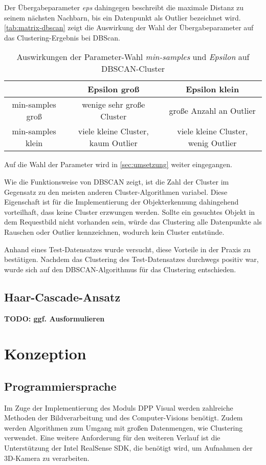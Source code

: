 \documentclass[
    type=Projektarbeit,
    status=draft, %
    language=german, %
    bibengine=bibtex,
]{unibwm-inf-thesis}
\newcommand{\todo}[1]{\textbf{TODO: #1}}
\begin{document}
    Der Übergabeparameter \textit{eps} dahingegen beschreibt die maximale Distanz zu seinem nächsten Nachbarn, bis ein Datenpunkt als Outlier bezeichnet wird.
    \autoref{tab:matrix-dbscan} zeigt die Auswirkung der Wahl der Übergabeparameter auf das Clustering-Ergebnis bei DBScan.
    \begin{table}[h]
        \centering
        \begin{tabular}{c | c | c}
            & Epsilon groß & Epsilon klein \\ \hline
            min-samples groß & wenige sehr große Cluster & große Anzahl an Outlier\\ \hline
            min-samples klein & viele kleine Cluster, kaum Outlier & viele kleine Cluster, wenig Outlier
        \end{tabular}
        \caption{Auswirkungen der Parameter-Wahl \textit{min-samples} und \textit{Epsilon} auf DBSCAN-Cluster}
        \label{tab:matrix-dbscan}
    \end{table}

    Auf die Wahl der Parameter wird in \autoref{sec:umsetzung} weiter eingegangen.

    Wie die Funktionsweise von DBSCAN zeigt, ist die Zahl der Cluster im Gegensatz zu den meisten anderen Cluster-Algorithmen variabel.
    Diese Eigenschaft ist für die Implementierung der Objekterkennung dahingehend vorteilhaft, dass keine Cluster \glqq erzwungen\grqq{} werden.
    Sollte ein gesuchtes Objekt in dem Requestbild nicht vorhanden sein, würde das Clustering alle Datenpunkte als Rauschen oder Outlier kennzeichnen, wodurch kein Cluster entstünde.

    Anhand eines Test-Datensatzes wurde versucht, diese Vorteile in der Praxis zu bestätigen.
    Nachdem das Clustering des Test-Datensatzes durchwegs positiv war, wurde sich auf den DBSCAN-Algorithmus für das Clustering entschieden.

    \subsection{Haar-Cascade-Ansatz}
    \todo{ggf. Ausformulieren}
    
    \section{Konzeption}
    \subsection{Programmiersprache}
    Im Zuge der Implementierung des Moduls DPP Visual werden zahlreiche Methoden der Bildverarbeitung und des
    Computer-Visions benötigt.
    Zudem werden Algorithmen zum Umgang mit großen Datenmengen, wie Clustering verwendet.
    Eine weitere Anforderung für den weiteren Verlauf ist die Unterstützung der Intel RealSense SDK, die benötigt wird,
    um Aufnahmen der 3D-Kamera zu verarbeiten.
\end{document}
